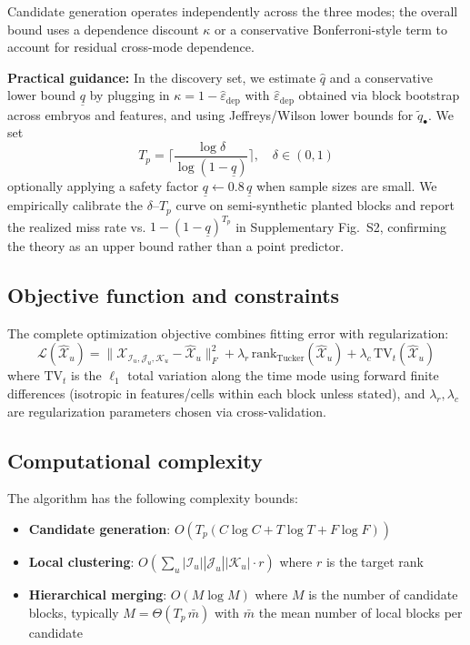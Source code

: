 \documentclass[unnumsec,webpdf,modern,large,namedate]{oup-authoring-template}%
\theoremstyle{thmstyleone}\newtheorem{theorem}{Theorem}
\theoremstyle{thmstyletwo}\newtheorem{example}{Example}
\theoremstyle{thmstylethree}\newtheorem{definition}{Definition}
\begin{document}
Candidate generation operates independently across the three modes; the overall bound uses a dependence discount $\kappa$ or a conservative Bonferroni-style term to account for residual cross-mode dependence.

\textbf{Practical guidance:} In the discovery set, we estimate $\hat q$ and a conservative lower bound $\underline q$ by plugging in $\kappa=1-\hat\varepsilon_{\mathrm{dep}}$ with $\hat\varepsilon_{\mathrm{dep}}$ obtained via block bootstrap across embryos and features, and using Jeffreys/Wilson lower bounds for $\tilde q_\bullet$. We set
\begin{equation}
T_p = \Big\lceil \frac{\log \delta}{\log(1-\underline q)} \Big\rceil, \quad \delta\in(0,1)
\label{eq:Tp-selection}
\end{equation}
optionally applying a safety factor $\underline q \leftarrow 0.8\,\underline q$ when sample sizes are small. We empirically calibrate the $\delta$--$T_p$ curve on semi-synthetic planted blocks and report the realized miss rate vs. $1-(1-\underline q)^{T_p}$ in Supplementary Fig.~S2, confirming the theory as an upper bound rather than a point predictor.

\subsection{Objective function and constraints}

The complete optimization objective combines fitting error with regularization:
\begin{equation}
\mathcal{L}(\hat{\mathcal{X}}_u) = \|\mathcal{X}_{\mathcal{I}_u,\mathcal{J}_u,\mathcal{K}_u}-\hat{\mathcal{X}}_u\|_F^2 + \lambda_r \, \text{rank}_{\text{Tucker}}(\hat{\mathcal{X}}_u) + \lambda_c \, \text{TV}_t(\hat{\mathcal{X}}_u)
\label{eq:objective}
\end{equation}
where $\text{TV}_t$ is the $\ell_1$ total variation along the time mode using forward finite differences (isotropic in features/cells within each block unless stated), and $\lambda_r, \lambda_c$ are regularization parameters chosen via cross-validation.

\subsection{Computational complexity}

The algorithm has the following complexity bounds:
\begin{itemize}
\item \textbf{Candidate generation}: $O(T_p(C\log C + T\log T + F\log F))$ 
\item \textbf{Local clustering}: $O(\sum_u |\mathcal{I}_u||\mathcal{J}_u||\mathcal{K}_u| \cdot r)$ where $r$ is the target rank
\item \textbf{Hierarchical merging}: $O(M\log M)$ where $M$ is the number of candidate blocks, typically $M = \Theta(T_p\, \bar m)$ with $\bar m$ the mean number of local blocks per candidate
\end{itemize}
\end{document}
